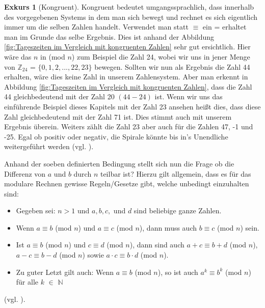 \documentclass[12pt,a4paper]{article}
\theoremstyle{definition}
\newtheorem{exkurs}{Exkurs}
\begin{document}
\newpage
\begin{exkurs}[Kongruent]
Kongruent bedeutet umgangssprachlich, dass innerhalb des vorgegebenen Systems in dem man sich bewegt und rechnet es sich eigentlich immer um die selben Zahlen handelt.
Verwendet man statt $\equiv$ ein = erhaltet man im Grunde das selbe Ergebnis.
Dies ist anhand der Abbildung \ref{fig:Tageszeiten im Vergleich mit kongruenten Zahlen} sehr gut ersichtlich.
Hier wäre das $n$ in (mod $n$) zum Beispiel die Zahl 24, wobei wir uns in jener Menge von $\mathbb{Z}_{24}$ = $\{0, 1, 2, ..., 22, 23\}$ bewegen.
Sollten wir nun als Ergebnis die Zahl 44 erhalten, wäre dies keine Zahl in unserem Zahlensystem.
Aber man erkennt in Abbildung \ref{fig:Tageszeiten im Vergleich mit kongruenten Zahlen}, dass die Zahl 44 gleichbedeutend mit der Zahl 20 $(44-24)$ ist.
Wenn wir uns das einführende Beispiel dieses Kapitels mit der Zahl 23 ansehen heißt dies, dass diese Zahl gleichbedeutend mit der Zahl 71 ist.
Dies stimmt auch mit unserem Ergebnis überein.
Weiters zählt die Zahl 23 aber auch für die Zahlen 47, -1 und -25.
Egal ob positiv oder negativ, die Spirale könnte bis in's Unendliche weitergeführt werden (vgl. \cite[298--299]{Meinel2011}).
\end{exkurs}

Anhand der soeben definierten Bedingung stellt sich nun die Frage ob die Differenz von $a$ und $b$ durch $n$ teilbar ist?
Hierzu gilt allgemein, dass es für das modulare Rechnen gewisse Regeln/Gesetze gibt, welche unbedingt einzuhalten sind:
\begin{itemize}
    \item Gegeben sei: $n>1$ und $a, b, c,$ und $d$ sind beliebige ganze Zahlen.
    \item Wenn $a\equiv b$ (mod $n$) und $a\equiv c$ (mod $n$), dann muss auch $b\equiv c$ (mod $n$) sein.
    \item Ist $a\equiv b$ (mod $n$) und $c\equiv d$ (mod $n$), dann sind auch $a + c\equiv b + d$ (mod $n$), $a - c\equiv b - d$ (mod $n$) sowie $a \cdot c\equiv b \cdot d$ (mod $n$).
    \item Zu guter Letzt gilt auch: Wenn $a\equiv b$ (mod $n$), so ist auch $a^k\equiv b^k$ (mod $n$) für alle $k$ $\in$ $\mathbb{N}$
\end{itemize}
(vgl. \cite[66]{RempeGillen2009}).
\end{document}
